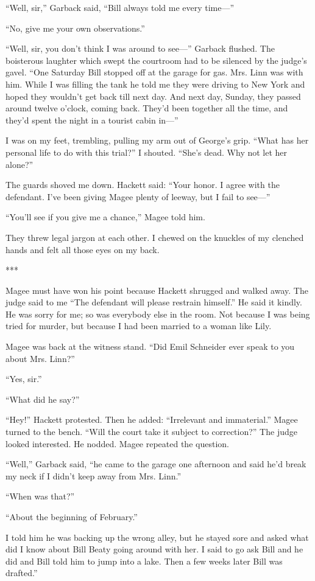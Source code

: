 \documentclass{novel}
\begin{document}
{“Well, sir,” Garback said, “Bill always told me every time—”

“No, give me your own observations.”

“Well, sir, you don’t think I was around to see—” Garback flushed. The boisterous laughter which swept the courtroom had to be silenced by the judge’s gavel. “One Saturday Bill stopped off at the garage for gas. Mrs. Linn was with him. While I was filling the tank he told me they were driving to New York and hoped they wouldn’t get back till next day. And next day, Sunday, they passed around twelve o’clock, coming back. They’d been together all the time, and they’d spent the night in a tourist cabin in—”

I was on my feet, trembling, pulling my arm out of George’s grip. “What has her personal life to do with this trial?” I shouted. “She’s dead. Why not let her alone?”

The guards shoved me down. Hackett said: “Your honor. I agree with the defendant. I’ve been giving Magee plenty of leeway, but I fail to see—”

“You’ll see if you give me a chance,” Magee told him.

They threw legal jargon at each other. I chewed on the knuckles of my clenched hands and felt all those eyes on my back.

***

Magee must have won his point because Hackett shrugged and walked away. The judge said to me “The defendant will please restrain himself.” He said it kindly. He was sorry for me; so was everybody else in the room. Not because I was being tried for murder, but because I had been married to a woman like Lily.

Magee was back at the witness stand. “Did Emil Schneider ever speak to you about Mrs. Linn?”

“Yes, sir.”

“What did he say?”

“Hey!” Hackett protested. Then he added: “Irrelevant and immaterial.” Magee turned to the bench. “Will the court take it subject to correction?” The judge looked interested. He nodded. Magee repeated the question.

“Well,” Garback said, “he came to the garage one afternoon and said he’d break my neck if I didn’t keep away from Mrs. Linn.”

“When was that?”

“About the beginning of February.”

I told him he was backing up the wrong alley, but he stayed sore and asked what did I know about Bill Beaty going around with her. I said to go ask Bill and he did and Bill told him to jump into a lake. Then a few weeks later Bill was drafted.”

}
\end{document}
